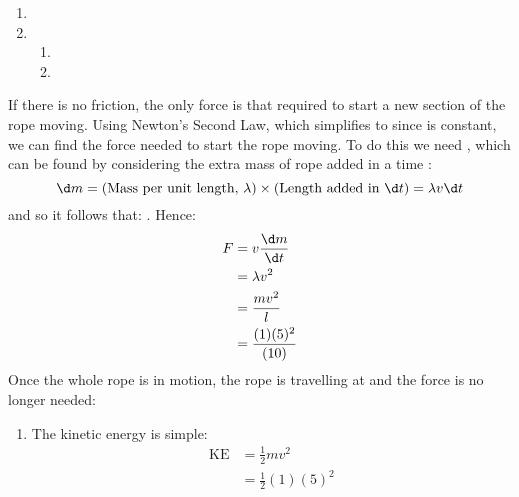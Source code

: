 
\begin{problem} 
{
\begin{enumerate}
	\item {}
	\item {}
	\begin{enumerate}
		\item {}
		\item {}
	\end{enumerate}
\end{enumerate}
}
{
}
{If there is no friction, the only force is that required to start a new section of the rope moving. Using Newton's Second Law,  which simplifies to  since  is constant, we can find the force needed to start the rope moving. To do this we need , which can be found by considering the extra mass of rope added in a time :
\begin{equation*} 
\d m = (\text{Mass per unit length, }\lambda)\times(\text{Length added in } \d t) = \lambda v \d t 
\end{equation*}
and so it follows that: .
Hence:
\begin{eqnarray*} 
F &= v\frac{\d m}{\d t} \\ 
&= \lambda v^{2} \\ 
&= \frac{mv^{2}}{l} \\ 
&= \frac{(1)(5)^{2}}{(10)}
\end{eqnarray*}
Once the whole rope is in motion, the rope is travelling at  and the force is no longer needed:
	\begin{enumerate}
		\item The kinetic energy is simple:
			\begin{eqnarray*} 
				\text{KE} &= \frac{1}{2}mv^{2} \\
					&= \frac{1}{2}(1)(5)^{2}
			\end{eqnarray*}
            

\end{enumerate}}
\end{problem}

